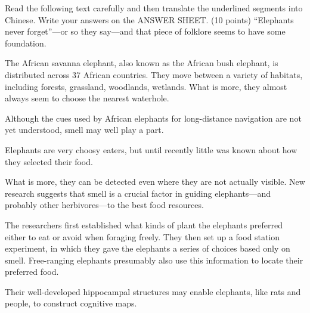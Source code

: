 \documentclass[12pt,a4paper]{article}
\begin{document}
\begin{translation}{
  Read the following text carefully and then translate the underlined segments into Chinese. Write your answers on the ANSWER SHEET. (10 points)
}
``Elephants never forget''---or so they say---and that piece of folklore seems to have some foundation.

The African savanna elephant, also known as the African bush elephant, is distributed across 37 African countries. They move between a variety of habitats, including forests, grassland, woodlands, wetlands.  What is more, they almost always seem to choose the nearest waterhole. 

Although the cues used by African elephants for long-distance navigation are not yet understood, smell may well play a part.

Elephants are very choosy eaters, but until recently little was known about how they selected their food. 

 What is more, they can be detected even where they are not actually visible. New research suggests that smell is a crucial factor in guiding elephants---and probably other herbivores---to the best food resources.

The researchers first established what kinds of plant the elephants preferred either to eat or avoid when foraging freely. They then set up a food station experiment, in which they gave the elephants a series of choices based only on smell.  Free-ranging elephants presumably also use this information to locate their preferred food.

Their well-developed hippocampal structures may enable elephants, like rats and people, to construct cognitive maps.
\end{translation}
\end{document}
